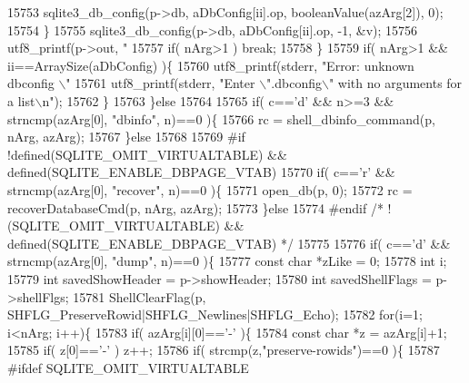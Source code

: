 \begin{DoxyCode}
{{{{{{{{15753         sqlite3_db_config(p->db, aDbConfig[ii].op, booleanValue(azArg[2]), 0);
15754       \}
15755       sqlite3_db_config(p->db, aDbConfig[ii].op, -1, &v);
15756       utf8_printf(p->out, \textcolor{stringliteral}{"%
15757       \textcolor{keywordflow}{if}( nArg>1 ) \textcolor{keywordflow}{break};
15758     \}
15759     \textcolor{keywordflow}{if}( nArg>1 && ii==ArraySize(aDbConfig) )\{
15760       utf8_printf(stderr, \textcolor{stringliteral}{"Error: unknown dbconfig \(\backslash\)"%
15761       utf8_printf(stderr, \textcolor{stringliteral}{"Enter \(\backslash\)".dbconfig\(\backslash\)" with no arguments for a list\(\backslash\)n"});
15762     \}   
15763   \}\textcolor{keywordflow}{else}
15764 
15765   \textcolor{keywordflow}{if}( c==\textcolor{charliteral}{'d'} && n>=3 && strncmp(azArg[0], \textcolor{stringliteral}{"dbinfo"}, n)==0 )\{
15766     rc = shell_dbinfo_command(p, nArg, azArg);
15767   \}\textcolor{keywordflow}{else}
15768 
15769 \textcolor{preprocessor}{#if !defined(SQLITE\_OMIT\_VIRTUALTABLE) && defined(SQLITE\_ENABLE\_DBPAGE\_VTAB)}
15770   \textcolor{keywordflow}{if}( c==\textcolor{charliteral}{'r'} && strncmp(azArg[0], \textcolor{stringliteral}{"recover"}, n)==0 )\{
15771     open_db(p, 0);
15772     rc = recoverDatabaseCmd(p, nArg, azArg);
15773   \}\textcolor{keywordflow}{else}
15774 \textcolor{preprocessor}{#endif }\textcolor{comment}{/* !(SQLITE\_OMIT\_VIRTUALTABLE) && defined(SQLITE\_ENABLE\_DBPAGE\_VTAB) */}\textcolor{preprocessor}{}
15775 
15776   \textcolor{keywordflow}{if}( c==\textcolor{charliteral}{'d'} && strncmp(azArg[0], \textcolor{stringliteral}{"dump"}, n)==0 )\{
15777     \textcolor{keyword}{const} \textcolor{keywordtype}{char} *zLike = 0;
15778     \textcolor{keywordtype}{int} i;
15779     \textcolor{keywordtype}{int} savedShowHeader = p->showHeader;
15780     \textcolor{keywordtype}{int} savedShellFlags = p->shellFlgs;
15781     ShellClearFlag(p, SHFLG_PreserveRowid|SHFLG_Newlines|SHFLG_Echo);
15782     \textcolor{keywordflow}{for}(i=1; i<nArg; i++)\{
15783       \textcolor{keywordflow}{if}( azArg[i][0]==\textcolor{charliteral}{'-'} )\{
15784         \textcolor{keyword}{const} \textcolor{keywordtype}{char} *z = azArg[i]+1;
15785         \textcolor{keywordflow}{if}( z[0]==\textcolor{charliteral}{'-'} ) z++;
15786         \textcolor{keywordflow}{if}( strcmp(z,\textcolor{stringliteral}{"preserve-rowids"})==0 )\{
15787 \textcolor{preprocessor}{#ifdef SQLITE\_OMIT\_VIRTUALTABLE}
}}}}}}}}}}
\end{DoxyCode}
